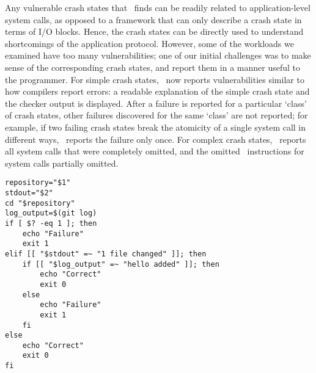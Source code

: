 Any vulnerable crash states that \Kassandra\ finds can be readily related to
application-level system calls, as opposed to a framework that can only
describe a crash state in terms of I/O blocks. Hence, the crash states can be
directly used to understand shortcomings of the application protocol. However,
some of the workloads we examined have too many vulnerabilities; one of our
initial challenges was to make sense of the corresponding crash states, and
report them in a manner useful to the programmer. For simple crash states,
\Kassandra\ now reports vulnerabilities similar to how compilers report
errors: a readable explanation of the simple crash state and the checker
output is displayed. After a failure is reported for a particular `class' of
crash states, other failures discovered for the same `class' are not reported;
for example, if two failing crash states break the atomicity of a single
system call in different ways, \Kassandra\ reports the failure only once. For
complex crash states, \Kassandra\ reports all system calls that were
completely omitted, and the omitted \microinstruction\ instructions for system
calls partially omitted.

\begin{lstlisting}
repository="$1"
stdout="$2"
cd "$repository"
log_output=$(git log)
if [ $? -eq 1 ]; then
    echo "Failure"
    exit 1
elif [[ "$stdout" =~ "1 file changed" ]]; then
    if [[ "$log_output" =~ "hello added" ]]; then
        echo "Correct"
        exit 0
    else
        echo "Failure"
        exit 1
    fi
else
    echo "Correct"
    exit 0
fi
\end{lstlisting}
\fi
